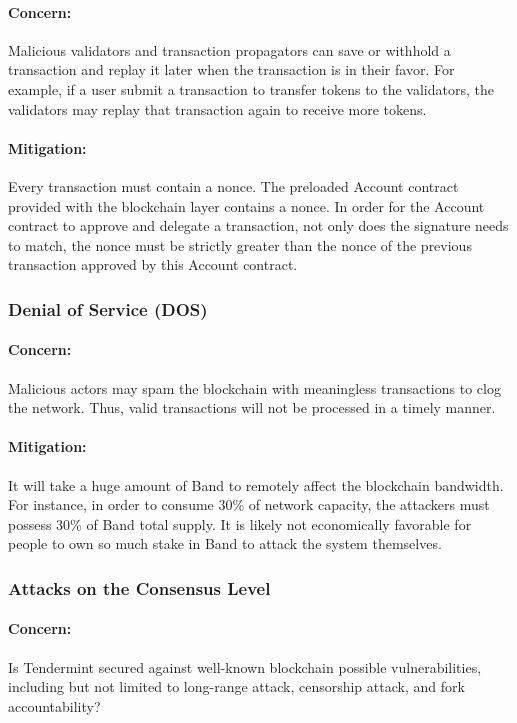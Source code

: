 \documentclass[letterpaper,11pt]{article}
\begin{document}
\paragraph{Concern:} Malicious validators and transaction propagators can save or withhold a transaction and replay it later when the transaction is in their favor. For example, if a user submit a transaction to transfer tokens to the validators, the validators may replay that transaction again to receive more tokens.

\paragraph{Mitigation:} Every transaction must contain a nonce. The preloaded Account contract provided with the blockchain layer contains a nonce. In order for the Account contract to approve and delegate a transaction, not only does the signature needs to match, the nonce must be strictly greater than the nonce of the previous transaction approved by this Account contract.

\subsubsection{Denial of Service (DOS)}
\paragraph{Concern:} Malicious actors may spam the blockchain with meaningless transactions to clog the network. Thus, valid transactions will not be processed in a timely manner.

\paragraph{Mitigation:} It will take a huge amount of Band to remotely affect the blockchain bandwidth. For instance, in order to consume 30\% of network capacity, the attackers must possess 30\% of Band total supply. It is likely not economically favorable for people to own so much stake in Band to attack the system themselves.

\subsubsection{Attacks on the Consensus Level}
\paragraph{Concern:}
Is Tendermint secured against well-known blockchain possible vulnerabilities, including but not limited to long-range attack, censorship attack, and fork accountability?
\end{document}
